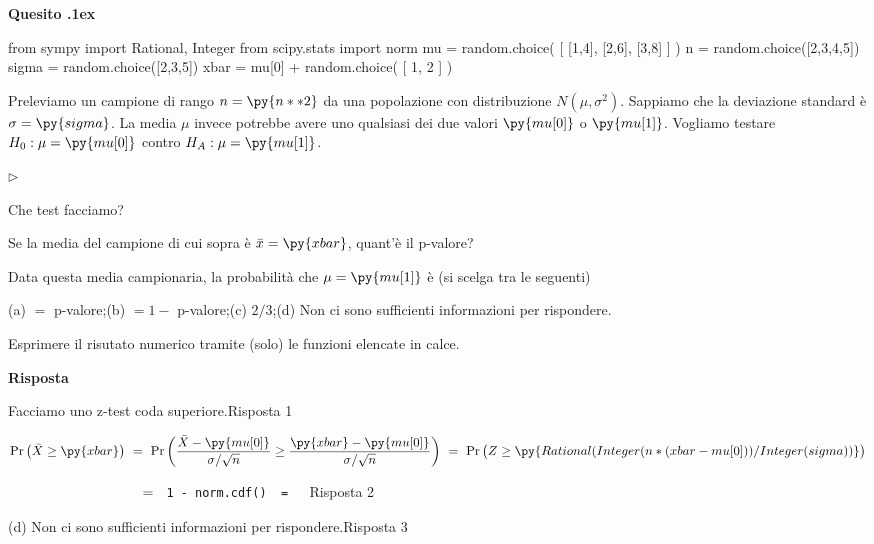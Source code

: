 \documentclass[11pt,twoside,a4paper]{article}
\newcommand{\mylabel}[1]{#1\hfill}
\renewenvironment{itemize}
  {\begin{list}{$\triangleright$}{%
   \setlength{\parskip}{0mm}
   \setlength{\topsep}{.4\baselineskip}
   \setlength{\rightmargin}{0mm}
   \setlength{\listparindent}{0mm}
   \setlength{\itemindent}{0mm}
   \setlength{\labelwidth}{2ex}
   \setlength{\itemsep}{.4\baselineskip}
   \setlength{\parsep}{0mm}
   \setlength{\partopsep}{0mm}
   \setlength{\labelsep}{1ex}
   \setlength{\leftmargin}{\labelwidth+\labelsep}
   \let\makelabel\mylabel}}{%
   \end{list}\vspace*{-1.3mm}}
\def\Pr{{\rm Pr\,}}
\newcounter{quesito}
\newenvironment{question}{\bigskip\addtocounter{quesito}{1}\par\textbf{Quesito \thequesito.\kern1ex}}{\vspace{\parskip}}
\newenvironment{answer}{\par\textbf{Risposta\quad}}{\vspace{\parskip}}
\begin{document}
\clearpage
\begin{question} %
\begin{pycode}
from sympy import Rational, Integer
from scipy.stats import norm
mu = random.choice( [ [1,4], [2,6], [3,8] ] ) 
n = random.choice([2,3,4,5])
sigma = random.choice([2,3,5])
xbar = mu[0] + random.choice( [ 1, 2 ] ) 
\end{pycode}
Preleviamo un campione di rango $n=\py{n**2}$ da una popolazione con distribuzione $N(\mu,\sigma^2)$. Sappiamo che la deviazione standard è $\sigma=\py{sigma}$. La media $\mu$ invece potrebbe avere uno qualsiasi dei due valori $\py{mu[0]}$ o $\py{mu[1]}$. Vogliamo testare $H_0:\mu=\py{mu[0]}$ contro $H_A:\mu=\py{mu[1]}$.
\begin{itemize}
\item[1.] Che test facciamo?
\item[2.] Se la media del campione di cui sopra è $\bar x=\py{xbar}$, quant'è il p-valore?
\item[3.] Data questa media campionaria, la probabilità che $\mu=\py{mu[1]}$ è (si scelga tra le seguenti)\medskip

(a) $=$ p-valore;\hfill (b) $=1-$ p-valore;\hfill (c) $2/3$;\hfill (d) Non ci sono sufficienti informazioni per rispondere.
\end{itemize}

Esprimere il risutato numerico tramite (solo) le funzioni elencate in calce.
\begin{answer}

{\color{blue}Facciamo uno z-test coda superiore.\hfill Risposta 1}

$\Pr\big(\bar X\ge\py{xbar}\big)\ =\ \Pr\bigg(\dfrac{\bar X-\py{mu[0]}}{\sigma/\sqrt{n}}\ge\dfrac{\py{xbar}-\py{mu[0]} }{\sigma/\sqrt{n} }\bigg)\ =\ \Pr\big(Z\ge\py{Rational(Integer(n*(xbar-mu[0]) ) / Integer(sigma) ) }\big)$

$\phantom{\Pr\big(\bar X\ge\py{xbar}\big)}\ =\ ${\color{blue}\tt\ 1 - norm.cdf() }{\tt\ =  \  }{\color{blue}\hfill Risposta 2}

\medskip
{\color{blue}(d) Non ci sono sufficienti informazioni per rispondere.\hfill Risposta 3}

\end{answer}
\end{question}
\end{document}

